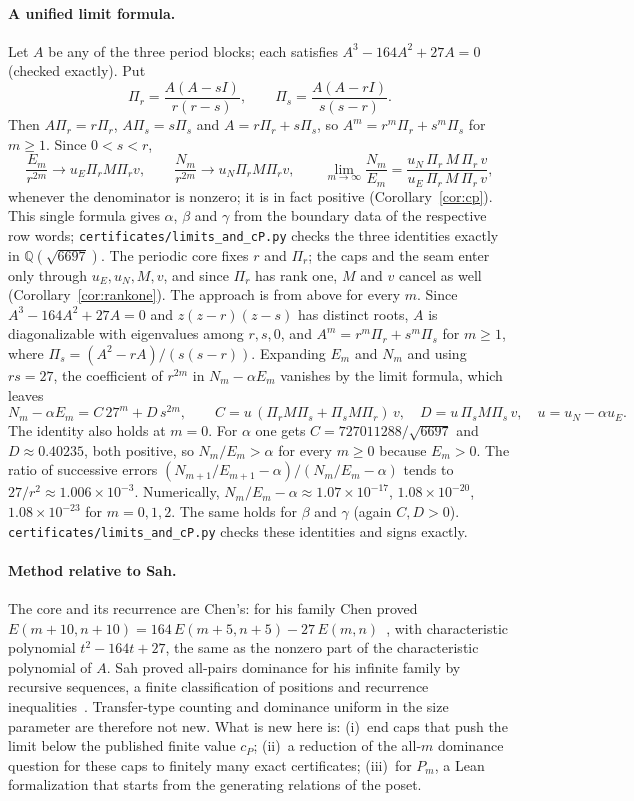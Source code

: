 \documentclass[11pt]{amsart}
\theoremstyle{definition}
\theoremstyle{remark}
\begin{document}
\paragraph{A unified limit formula.} Let $A$ be any of the three period blocks; each satisfies $A^3-164A^2+27A=0$ (checked exactly). Put
\[
\Pi_r=\frac{A(A-sI)}{r(r-s)},\qquad \Pi_s=\frac{A(A-rI)}{s(s-r)}.
\]
Then $A\Pi_r=r\Pi_r$, $A\Pi_s=s\Pi_s$ and $A=r\Pi_r+s\Pi_s$, so $A^m=r^m\Pi_r+s^m\Pi_s$ for $m\ge1$. Since $0<s<r$,
\[
\frac{E_m}{r^{2m}}\to u_E\Pi_rM\Pi_rv,\qquad \frac{N_m}{r^{2m}}\to u_N\Pi_rM\Pi_rv,\qquad
\lim_{m\to\infty}\frac{N_m}{E_m}=\frac{u_N\,\Pi_r\,M\,\Pi_r\,v}{u_E\,\Pi_r\,M\,\Pi_r\,v},
\]
whenever the denominator is nonzero; it is in fact positive (Corollary~\ref{cor:cp}). This single formula gives $\alpha$, $\beta$ and $\gamma$ from the boundary data of the respective row words; \texttt{certificates/limits\_and\_cP.py} checks the three identities exactly in $\mathbb{Q}(\sqrt{6697})$. The periodic core fixes $r$ and $\Pi_r$; the caps and the seam enter only through $u_E,u_N,M,v$, and since $\Pi_r$ has rank one, $M$ and $v$ cancel as well (Corollary~\ref{cor:rankone}). The approach is from above for every $m$. Since $A^3-164A^2+27A=0$ and $z(z-r)(z-s)$ has distinct roots, $A$ is diagonalizable with eigenvalues among $r,s,0$, and $A^m=r^m\Pi_r+s^m\Pi_s$ for $m\ge1$, where $\Pi_s=(A^2-rA)/(s(s-r))$. Expanding $E_m$ and $N_m$ and using $rs=27$, the coefficient of $r^{2m}$ in $N_m-\alpha E_m$ vanishes by the limit formula, which leaves
\[
N_m-\alpha E_m=C\,27^m+D\,s^{2m},\qquad C=u\,(\Pi_rM\Pi_s+\Pi_sM\Pi_r)\,v,\quad D=u\,\Pi_sM\Pi_s\,v,\quad u=u_N-\alpha u_E .
\]
The identity also holds at $m=0$. For $\alpha$ one gets $C=727011288/\sqrt{6697}$ and $D\approx0.40235$, both positive, so $N_m/E_m>\alpha$ for every $m\ge0$ because $E_m>0$. The ratio of successive errors $(N_{m+1}/E_{m+1}-\alpha)/(N_m/E_m-\alpha)$ tends to $27/r^2\approx1.006\times10^{-3}$. Numerically, $N_m/E_m-\alpha\approx1.07\times10^{-17}$, $1.08\times10^{-20}$, $1.08\times10^{-23}$ for $m=0,1,2$. The same holds for $\beta$ and $\gamma$ (again $C,D>0$). \texttt{certificates/limits\_and\_cP.py} checks these identities and signs exactly.

\paragraph{Method relative to Sah.}
The core and its recurrence are Chen's: for his family Chen proved $E(m+10,n+10)=164\,E(m+5,n+5)-27\,E(m,n)$~\cite[Lemma~15]{Chen18}, with characteristic polynomial $t^2-164t+27$, the same as the nonzero part of the characteristic polynomial of $A$. Sah proved all-pairs dominance for his infinite family by recursive sequences, a finite classification of positions and recurrence inequalities~\cite{Sah21}. Transfer-type counting and dominance uniform in the size parameter are therefore not new. What is new here is: (i)~end caps that push the limit below the published finite value $c_P$; (ii)~a reduction of the all-$m$ dominance question for these caps to finitely many exact certificates; (iii)~for $P_m$, a Lean formalization that starts from the generating relations of the poset.
\end{document}
